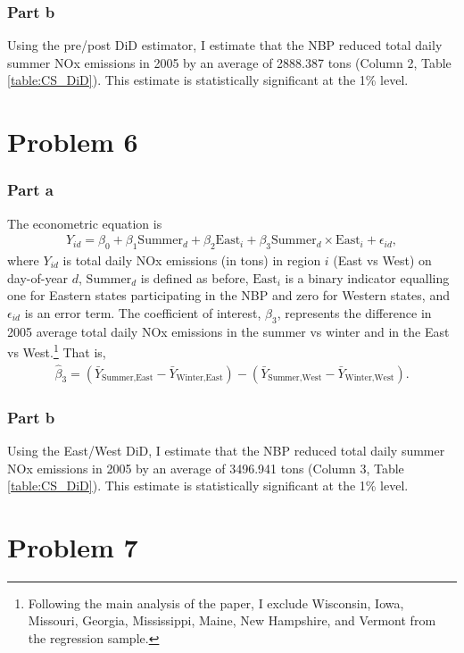 \documentclass[12pt]{article}
\begin{document}
\subsubsection*{Part b}
Using the pre/post DiD estimator, I estimate that the NBP reduced total daily summer NOx emissions in 2005 by an average of 2888.387 tons (Column 2, Table \ref{table:CS_DiD}). This estimate is statistically significant at the 1\% level.

\section*{Problem 6}

\subsubsection*{Part a}
The econometric equation is
\begin{align}
	Y_{id} = \beta_0 + \beta_1 \text{Summer}_d + \beta _2 \text{East}_i + \beta_3 \text{Summer}_d \times \text{East}_i + \epsilon_{id},
\end{align}
where $Y_{id}$ is total daily NOx emissions (in tons) in region $i$ (East vs West) on day-of-year $d$, $\text{Summer}_d$ is defined as before, $\text{East}_i$ is a binary indicator equalling one for Eastern states participating in the NBP and zero for Western states, and $\epsilon_{id}$ is an error term. The coefficient of interest, $\beta_3$, represents the difference in 2005 average total daily NOx emissions in the summer vs winter and in the East vs West.\footnote{Following the main analysis of the paper, I exclude Wisconsin, Iowa, Missouri, Georgia, Mississippi, Maine, New Hampshire, and Vermont from the regression sample.} That is,
\begin{align*}
	\hat{\beta}_3 = (\bar{Y}_{\text{Summer}, \text{East}} -  \bar{Y}_{\text{Winter}, \text{East}}) - (\bar{Y}_{\text{Summer}, \text{West}} - \bar{Y}_{\text{Winter}, \text{West}}).
\end{align*}

\subsubsection*{Part b}
Using the East/West DiD, I estimate that the NBP reduced total daily summer NOx emissions in 2005 by an average of 3496.941 tons (Column 3, Table \ref{table:CS_DiD}). This estimate is statistically significant at the 1\% level.

\section*{Problem 7}
\end{document}

